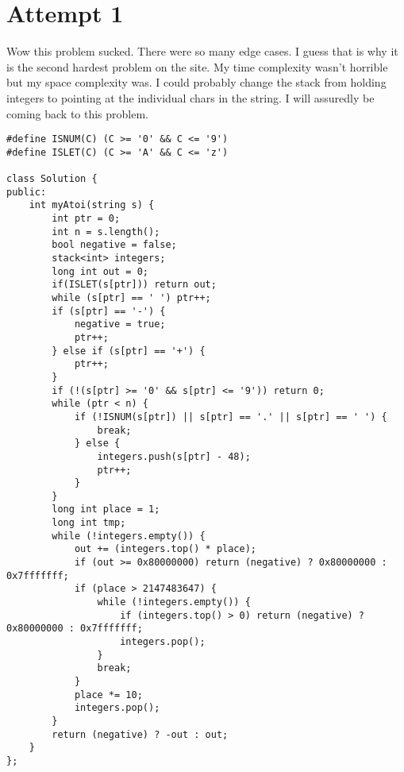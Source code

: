 \section{Attempt 1}
Wow this problem sucked. There were so many edge cases. I guess that is why it is the second hardest problem on the site. My time complexity wasn't horrible but my space complexity was. I could probably change the stack from holding integers to pointing at the individual
chars in the string. I will assuredly be coming back to this problem.
\begin{lstlisting}
#define ISNUM(C) (C >= '0' && C <= '9')
#define ISLET(C) (C >= 'A' && C <= 'z')

class Solution {
public:
    int myAtoi(string s) {
        int ptr = 0;
        int n = s.length();
        bool negative = false;
        stack<int> integers;
        long int out = 0;
        if(ISLET(s[ptr])) return out;
        while (s[ptr] == ' ') ptr++;
        if (s[ptr] == '-') {
            negative = true;
            ptr++;
        } else if (s[ptr] == '+') {
            ptr++;
        }
        if (!(s[ptr] >= '0' && s[ptr] <= '9')) return 0;
        while (ptr < n) {
            if (!ISNUM(s[ptr]) || s[ptr] == '.' || s[ptr] == ' ') {
                break;
            } else {
                integers.push(s[ptr] - 48);
                ptr++;
            }
        }
        long int place = 1;
        long int tmp;
        while (!integers.empty()) {
            out += (integers.top() * place);
            if (out >= 0x80000000) return (negative) ? 0x80000000 : 0x7fffffff;
            if (place > 2147483647) {
                while (!integers.empty()) {
                    if (integers.top() > 0) return (negative) ? 0x80000000 : 0x7fffffff;
                    integers.pop();
                }
                break;
            }
            place *= 10;
            integers.pop();
        }
        return (negative) ? -out : out;
    }
};
\end{lstlisting}
